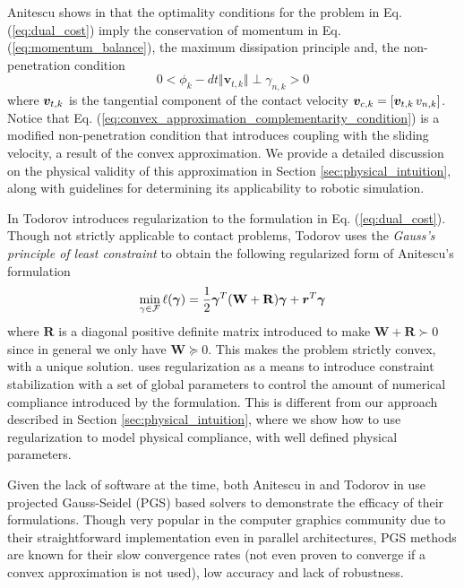 Anitescu shows in \cite{bib:anitescu2006} that the optimality conditions for the
problem in Eq. (\ref{eq:dual_cost}) imply the conservation of momentum in Eq.
(\ref{eq:momentum_balance}), the maximum dissipation principle and, the
non-penetration condition
\begin{equation}
	0 < \phi_k - dt \Vert {\bm v}_{t,k} \Vert \perp \gamma_{n,k} > 0
	\label{eq:convex_approximation_complementarity_condition}
\end{equation}
where ${\bm{v}}_{t,k}$ is the tangential component of the contact velocity
${\bm{v}}_{c,k} = [{\bm{v}}_{t,k}\,v_{n,k}]$. Notice that Eq.
(\ref{eq:convex_approximation_complementarity_condition}) is a modified
non-penetration condition that introduces coupling with the sliding velocity, a
result of the convex approximation. We provide a detailed discussion on the
physical validity of this approximation in Section \ref{sec:physical_intuition},
along with guidelines for determining its applicability to robotic simulation.

In \cite{bib:todorov2011, bib:todorov2014} Todorov introduces regularization to
the formulation in Eq. (\ref{eq:dual_cost}). Though not strictly applicable to
contact problems, Todorov uses the \emph{Gauss's principle of least
constraint} to obtain the following regularized form of Anitescu's formulation
\begin{eqnarray}
	\min_{\gamma\in \mathcal{F}} \ell(\bgamma) =
	\frac{1}{2}\bgamma^T(\mathbf{W}+\mathbf{R})\bgamma + {\bm r}^T
	\bgamma
	\label{eq:dual_regularized}
\end{eqnarray}
where $\mathbf{R}$ is a diagonal positive definite matrix introduced to make
$\mathbf{W}+\mathbf{R}\succ 0$ since in general we only have $\mathbf{W} \succeq
0$. This makes the problem strictly convex, with a unique solution.
\cite{bib:todorov2014} uses regularization as a means to introduce constraint
stabilization with a set of global parameters to control the amount of numerical
compliance introduced by the formulation. This is different from our approach
described in Section \ref{sec:physical_intuition}, where we show how to use
regularization to model physical compliance, with well defined physical
parameters.

Given the lack of software at the time, both Anitescu in \cite{bib:anitescu2010}
and Todorov in \cite{bib:todorov2014} use projected Gauss-Seidel (PGS) based
solvers to demonstrate the efficacy of their formulations. Though very popular
in the computer graphics community due to their straightforward implementation
even in parallel architectures, PGS methods are known for their slow convergence
rates (not even proven to converge if a convex approximation is not used), low
accuracy and lack of robustness.

